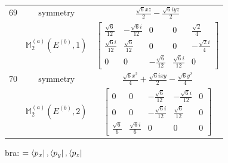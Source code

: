 \documentclass[fleqn,8pt,landscape]{jsarticle}
\begin{document}
\begin{longtable}{ccc}
$ 69 $ & $ \text{symmetry} $ & $ \frac{\sqrt{6} x z}{2} - \frac{\sqrt{6} i y z}{2} $ \\
$  $ & $ \mathbb{M}_{2}^{(a)}(E^{(b)},1) $ & $ \begin{bmatrix} \frac{\sqrt{6}}{12} & - \frac{\sqrt{6} i}{12} & 0 & 0 & \frac{\sqrt{2}}{4} \\ \frac{\sqrt{6} i}{12} & \frac{\sqrt{6}}{12} & 0 & 0 & - \frac{\sqrt{2} i}{4} \\ 0 & 0 & - \frac{\sqrt{6}}{12} & \frac{\sqrt{6} i}{12} & 0 \end{bmatrix} $ \\ \hline
$ 70 $ & $ \text{symmetry} $ & $ \frac{\sqrt{6} x^{2}}{4} + \frac{\sqrt{6} i x y}{2} - \frac{\sqrt{6} y^{2}}{4} $ \\
$  $ & $ \mathbb{M}_{2}^{(a)}(E^{(b)},2) $ & $ \begin{bmatrix} 0 & 0 & - \frac{\sqrt{6}}{12} & - \frac{\sqrt{6} i}{12} & 0 \\ 0 & 0 & - \frac{\sqrt{6} i}{12} & \frac{\sqrt{6}}{12} & 0 \\ \frac{\sqrt{6}}{6} & \frac{\sqrt{6} i}{6} & 0 & 0 & 0 \end{bmatrix} $ \\ \hline
\end{longtable}
bra: $=\bra{p_{x}}, \bra{p_{y}}, \bra{p_{z}}$
\end{document}
